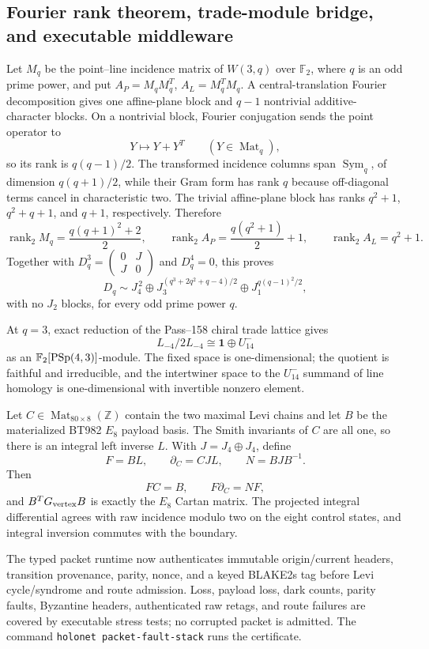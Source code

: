 \subsection{Fourier rank theorem, trade-module bridge, and executable middleware}
\label{sec:levi-next5}

Let $M_q$ be the point--line incidence matrix of $W(3,q)$ over $\mathbb F_2$,
where $q$ is an odd prime power, and put
$A_P=M_qM_q^T$, $A_L=M_q^TM_q$. A central-translation Fourier
decomposition gives one affine-plane block and $q-1$ nontrivial additive-
character blocks. On a nontrivial block, Fourier conjugation sends the point
operator to
\[
Y\longmapsto Y+Y^T\qquad(Y\in\operatorname{Mat}_q),
\]
so its rank is $q(q-1)/2$. The transformed incidence columns span
$\operatorname{Sym}_q$, of dimension $q(q+1)/2$, while their Gram form has
rank $q$ because off-diagonal terms cancel in characteristic two. The
trivial affine-plane block has ranks $q^2+1$, $q^2+q+1$, and $q+1$,
respectively. Therefore
\[
\operatorname{rank}_2M_q=\frac{q(q+1)^2+2}{2},\qquad
\operatorname{rank}_2A_P=\frac{q(q^2+1)}2+1,\qquad
\operatorname{rank}_2A_L=q^2+1.
\]
Together with $D_q^3=\left(\begin{smallmatrix}0&J\\J&0\end{smallmatrix}\right)$
and $D_q^4=0$, this proves
\[
D_q\sim J_4^{\,2}\oplus J_3^{(q^3+2q^2+q-4)/2}\oplus J_1^{q(q-1)^2/2},
\]
with no $J_2$ blocks, for every odd prime power $q$.

At $q=3$, exact reduction of the Pass--158 chiral trade lattice gives
\[
L_{-4}/2L_{-4}\cong\mathbf1\oplus U_{14}^-
\]
as an $\mathbb F_2[\mathrm{PSp}(4,3)]$-module. The fixed space is one-dimensional;
the quotient is faithful and irreducible, and the intertwiner space to the
$U_{14}^-$ summand of line homology is one-dimensional with invertible
nonzero element.

Let $C\in\operatorname{Mat}_{80\times8}(\mathbb Z)$ contain the two maximal
Levi chains and let $B$ be the materialized BT982 $E_8$ payload basis. The
Smith invariants of $C$ are all one, so there is an integral left inverse
$L$. With $J=J_4\oplus J_4$, define
\[
F=BL,\qquad \partial_C=CJL,\qquad N=BJB^{-1}.
\]
Then
\[
FC=B,\qquad F\partial_C=NF,
\]
and $B^TG_{\rm vertex}B$ is exactly the $E_8$ Cartan matrix. The projected
integral differential agrees with raw incidence modulo two on the eight
control states, and integral inversion commutes with the boundary.

The typed packet runtime now authenticates immutable origin/current headers,
transition provenance, parity, nonce, and a keyed BLAKE2s tag before Levi
cycle/syndrome and route admission. Loss, payload loss, dark counts, parity
faults, Byzantine headers, authenticated raw retags, and route failures are
covered by executable stress tests; no corrupted packet is admitted. The
command \texttt{holonet packet-fault-stack} runs the certificate.

